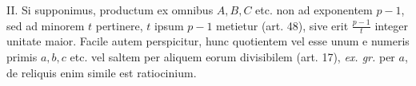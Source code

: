 II. Si supponimus, productum ex omnibus $A,B,C$ etc. non ad exponentem $p-1$, sed ad minorem $t$ pertinere, $t$ ipsum $p-1$ metietur (art. 48), sive erit $\frac{p-1}{t}$ integer unitate maior. Facile autem perspicitur, hunc quotientem vel esse unum e numeris primis $a,b,c$ etc. vel saltem per aliquem eorum divisibilem (art. 17), \emph{ex. gr.} per $a$, de reliquis enim simile est ratiocinium.
